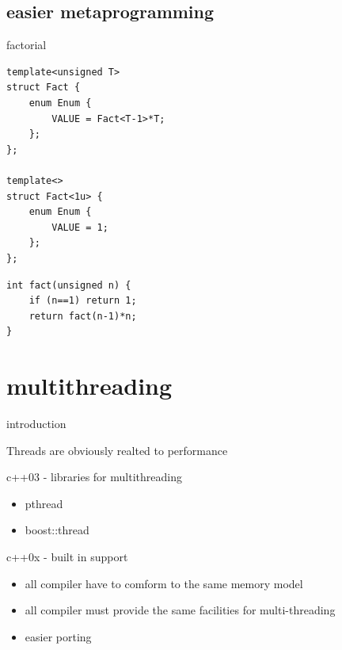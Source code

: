 \documentclass{beamer}
\begin{document}
\subsection{easier metaprogramming}
\begin{frame}{factorial}
  \begin{block}{}
\begin{verbatim}
template<unsigned T>
struct Fact {
    enum Enum {
        VALUE = Fact<T-1>*T;
    };
};

template<>
struct Fact<1u> {
    enum Enum {
        VALUE = 1;
    };
};

\end{verbatim}
  \end{block}

  \begin{block}{}
\begin{verbatim}
int fact(unsigned n) {
    if (n==1) return 1;
    return fact(n-1)*n;
}

\end{verbatim}
  \end{block}
\end{frame}

\section{multithreading}
\begin{frame}{introduction}
  \begin{block}{}
    Threads are obviously realted to performance
  \end{block}

  \begin{block}{c++03 - libraries for multithreading}
    \begin{itemize}
    \item pthread
    \item boost::thread
    \end{itemize}
  \end{block}

  \begin{block}{c++0x - built in support}
    \begin{itemize}
    \item all compiler have to comform to the same memory model
    \item all compiler must provide the same facilities for multi-threading
    \item easier porting
    \end{itemize}
  \end{block}
\end{frame}
\end{document}
